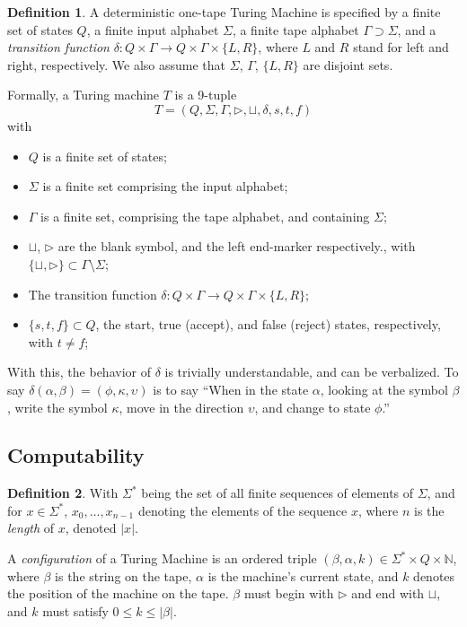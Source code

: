 \documentclass[11pt,letterpaper]{article}
\theoremstyle{definition}
\newtheorem{defn}{Definition}[section]
\begin{document}
\begin{defn}\label{def:turingm}
	A deterministic one-tape Turing Machine is specified by a finite set of states \(Q \), a finite input alphabet \(\Sigma \), a finite tape alphabet \(\Gamma \supset \Sigma \), and a \emph{transition function} \(\delta\colon Q\times\Gamma\to Q\times \Gamma\times \{L, R\} \), where \(L \) and \(R \) stand for left and right, respectively. We also assume that \(\Sigma \), \(\Gamma \), \( \{L, R\} \) are disjoint sets.\autocite{kleinberg_2012}\autocite{kleinberg_2013}

	Formally, a Turing machine \(T \) is a 9-tuple\autocite{kozen_1997}
	\[
		T = (Q, \Sigma, \Gamma, \triangleright,\sqcup,\delta,s,t,f)
	\]
	with
	\begin{itemize}
		\item \(Q \) is a finite set of states;
		\item \(\Sigma \) is a finite set comprising the input alphabet;
		\item \(\Gamma \) is a finite set, comprising the tape alphabet, and containing \(\Sigma \);
		\item \(\sqcup \), \(\triangleright \) are the blank symbol, and the left end-marker respectively., with \( \{\sqcup, \triangleright \}\subset\Gamma \setminus \Sigma \);
		\item The transition function \(\delta\colon Q\times\Gamma\to Q\times \Gamma\times \{L, R\} \);
		\item \( \{s,t,f\}\subset Q \), the start, true (accept), and false (reject) states, respectively, with \(t \neq f \);
	\end{itemize}
\end{defn}

With this, the behavior of \(\delta \) is trivially understandable, and can be verbalized. To say \(\delta(\alpha, \beta) = (\phi,\kappa,\upsilon) \) is to say ``When in the state \(\alpha \), looking at the symbol \(\beta \), write the symbol \(\kappa \), move in the direction \(\upsilon \), and change to state \(\phi \).''\autocite{sep-turing-machine}

\subsection{Computability}
\begin{defn}\label{def:config}
	With \(\Sigma^* \) being the set of all finite sequences of elements of \(\Sigma \), and for \(x\in\Sigma^* \), \(x_0,\ldots,x_{n-1} \) denoting the elements of the sequence \(x \), where \(n \) is the \emph{length} of \(x \), denoted \(|x| \).

	A \emph{configuration} of a Turing Machine is an ordered triple \((\beta, \alpha, k)\in\Sigma^*\times Q\times \mathbb N \), where \(\beta \) is the string on the tape, \(\alpha \) is the machine's current state, and \(k \) denotes the position of the machine on the tape. \(\beta \) must begin with \(\triangleright \) and end with \(\sqcup \), and \(k \) must satisfy \(0\leq k \leq |\beta| \).\autocite{kleinberg_2012}
\end{defn}
\end{document}
